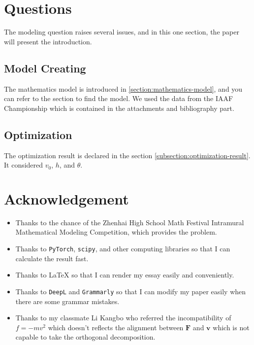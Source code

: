 \documentclass{article}
\begin{document}
\section{Questions}

\label{section:questions}

The modeling question raises several issues, and in this one section, the paper will present the introduction.

\subsection{Model Creating}

\label{subsection:model-creating}

The mathematics model is introduced in \ref{section:mathematics-model}, and you can refer to the section to find the model. We used the data from the IAAF Championship which is contained in the attachments and bibliography part.

\subsection{Optimization}

\label{subsection:optimization}

The optimization result is declared in the section \ref{subsection:optimization-result}. It considered $v_0$, $h$, and $\theta$.

\section{Acknowledgement}

\label{section:acknowledgement}

\begin{itemize}
    \item Thanks to the chance of the Zhenhai High School Math Festival Intramural Mathematical Modeling Competition, which provides the problem.
    \item Thanks to \texttt{PyTorch}, \texttt{scipy}, and other computing libraries so that I can calculate the result fast.
    \item Thanks to \LaTeX{} so that I can render my essay easily and conveniently.
    \item Thanks to \texttt{DeepL} and \texttt{Grammarly} so that I can modify my paper easily when there are some grammar mistakes.
    \item Thanks to my classmate Li Kangbo who referred the incompatibility of $f=-mv^2$ which doesn't reflects the alignment between $\boldsymbol{F}$ and $\boldsymbol{v}$ which is not capable to take the orthogonal decomposition.
\end{itemize}
\end{document}

